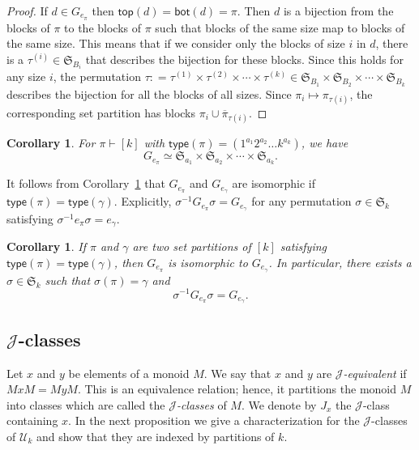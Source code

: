 \documentclass[10pt]{amsart}
\newtheorem{cor}[theorem]{Corollary}
\theoremstyle{definition}
\theoremstyle{remark}
\newcommand{\defncolor}{\color{darkred}}
\newcommand{\defn}[1]{{\defncolor\emph{#1}}} %
\begin{document}
\begin{proof}
If $d\in G_{e_\pi}$ then $\mathsf{top}(d) = \mathsf{bot}(d) = \pi$. Then $d$ is a bijection from the
blocks of $\pi$ to the blocks of $\pi$ such that blocks of the same size map to blocks of the same size.  This means that if
we consider only the blocks of size $i$ in $d$, there is a $\tau^{(i)} \in \mathfrak{S}_{B_i}$ that describes the bijection for these blocks.
Since this holds for any size $i$, the permutation $\tau : = \tau^{(1)} \times \tau^{(2)}\times \cdots \times \tau^{(k)} \in \mathfrak{S}_{B_1}
\times \mathfrak{S}_{B_2}\times \cdots \times \mathfrak{S}_{B_k}$ describes the bijection for all the blocks of all sizes.  Since $\pi_i \mapsto \pi_{\tau(i)}$,
the corresponding set partition has blocks $\pi_i \cup \overline{\pi}_{\tau(i)}$.
\end{proof}

\begin{cor} \label{cor:whatisGe}
For $\pi \vdash [k]$ with $\mathsf{type}(\pi)= (1^{a_1}2^{a_2}\ldots k^{a_k})$, we have
\[
    G_{e_\pi} \simeq \mathfrak{S}_{a_1} \times \mathfrak{S}_{a_2} \times \cdots \times \mathfrak{S}_{a_k}.
\]
\end{cor}

It follows from Corollary~\ref{cor:whatisGe} that
$G_{e_\pi}$ and $G_{e_\gamma}$ are isomorphic if $\mathsf{type}(\pi)
= \mathsf{type}(\gamma)$. Explicitly, $\sigma^{-1} G_{e_\pi} \sigma
= G_{e_\gamma}$ for any permutation $\sigma \in \mathfrak{S}_k$
satisfying $\sigma^{-1} e_\pi \sigma = e_\gamma$.

\begin{cor}\label{cor:isomGe}
If $\pi$ and $\gamma$ are two set partitions of $[k]$ satisfying $\mathsf{type}(\pi) = \mathsf{type}(\gamma)$, then $G_{e_\pi}$
is isomorphic to $G_{e_\gamma}$. In particular, there exists a $\sigma \in \mathfrak{S}_k$ such that $\sigma(\pi) = \gamma$ and
\[
    \sigma^{-1} G_{e_\pi} \sigma = G_{e_\gamma}.
\]
\end{cor}

\subsection{$\mathscr{J}$-classes}
\label{section.J classes}

Let $x$ and $y$ be elements of a monoid $M$.  We say that $x$ and $y$ are \defn{$\mathscr{J}$-equivalent} if $MxM = MyM$.
This is an equivalence relation; hence, it partitions the monoid $M$ into classes which are called the \defn{$\mathscr{J}$-classes} of $M$. We denote by \defn{$J_x$} the $\mathscr{J}$-class containing $x$.
In the next proposition we give a characterization for the $\mathscr{J}$-classes of $\mathcal{U}_k$ and show that they are indexed by partitions of $k$.
\end{document}

